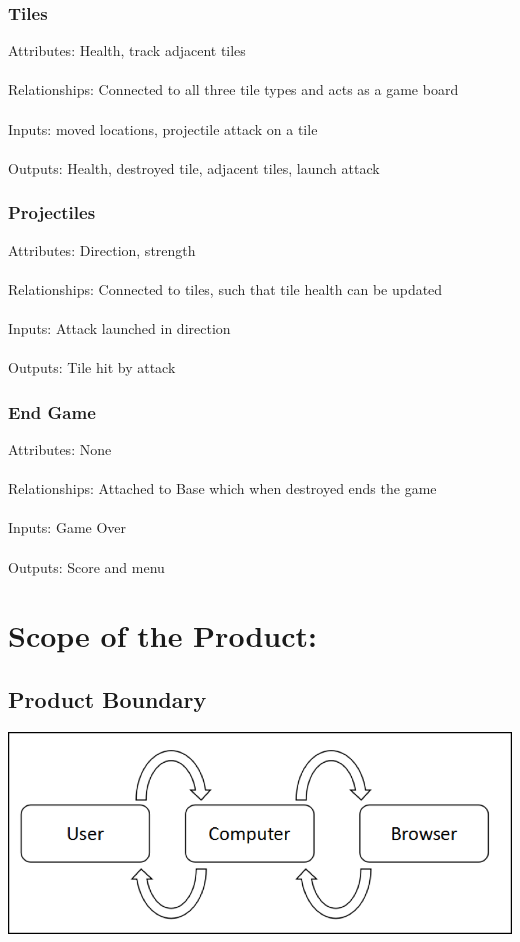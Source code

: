 \documentclass{article}
\begin{document}
\subsubsection{Tiles}
Attributes: Health, track adjacent tiles
\\\\Relationships: Connected to all three tile types and acts as a game board
\\\\Inputs: moved locations, projectile attack on a tile
\\\\Outputs: Health, destroyed tile, adjacent tiles, launch attack

\subsubsection{Projectiles}
Attributes: Direction, strength
\\\\Relationships: Connected to tiles, such that tile health can be updated
\\\\Inputs: Attack launched in direction
\\\\Outputs: Tile hit by attack

\subsubsection{End Game}
Attributes: None
\\\\Relationships: Attached to Base which when destroyed ends the game
\\\\Inputs: Game Over
\\\\Outputs: Score and menu


\section {Scope of the Product:}
\subsection{Product Boundary}
\includegraphics[width=\textwidth]{Fig4.png}
\end{document}

